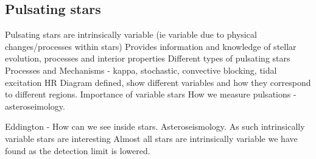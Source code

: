 \subsection{Pulsating stars}

Pulsating stars are intrinsically variable (ie variable due to physical changes/processes within stars)
Provides information and knowledge of stellar evolution, processes and interior properties
Different types of pulsating stars
Processes and Mechanisms - kappa, stochastic, convective blocking, tidal excitation
HR Diagram defined, show different variables and how they correspond to different regions.
Importance of variable stars
How we measure pulsations - asteroseimology.

Eddington - How can we see inside stars.
Asteroseismology. As such intrinsically variable stars are interesting
Almost all stars are intrinsically variable we have found as the detection limit is lowered.







